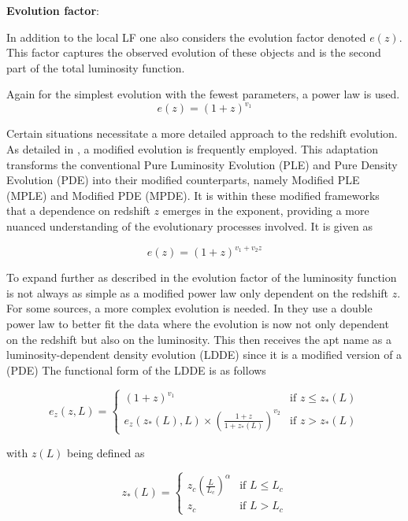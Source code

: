 \documentclass{article}
\begin{document}


\textbf{Evolution factor}:

In addition to the local LF one also considers the evolution factor denoted $e(z)$. This factor captures the observed evolution of these objects and is the second part of the total luminosity function.

Again for the simplest evolution with the fewest parameters, a power law is used.
 $$
e(z) = (1 + z)^{v_1 }
 $$


  
Certain situations necessitate a more detailed approach to the redshift evolution. 
 As detailed in \cite{Ajello_2009}, a modified evolution is frequently employed. 
 This adaptation transforms the conventional Pure Luminosity Evolution (PLE) and Pure Density Evolution 
 (PDE) into their modified counterparts, namely Modified PLE (MPLE) and Modified PDE (MPDE).
It is within these modified frameworks that a dependence on redshift $z$ emerges in the exponent,
providing a more nuanced understanding of the evolutionary processes involved. It is given as

$$
e(z) = (1 + z)^{v_1 +v_2 z }
 $$



 To expand further as described in \cite{Silverman_2008} the evolution factor of the luminosity function is not always as simple as a modified power law only dependent on the redshift $z$.
For some sources, a more complex evolution is needed. In \cite{Silverman_2008} they use a double power law to better fit the data where 
 the evolution is now not only dependent on the redshift but also on the luminosity. This then receives the apt name as a luminosity-dependent density evolution (LDDE) since it is a modified version of a (PDE)
 The functional form of the LDDE is as follows


 \begin{equation}
    e_z(z, L) = 
    \begin{cases} 
    (1 + z)^{v_1} & \text{if } z \leq z_*(L) \\
    e_z(z_*(L), L) \times \left( \frac{1 + z}{1 + z_*(L)} \right)^{v_2} & \text{if } z >  z_*(L)
    \end{cases}
 \end{equation}

 with $z(L)$ being defined as

 \begin{equation}
    z_*(L) = 
    \begin{cases} 
    z_c \left( \frac{L}{L_c} \right)^\alpha & \text{if } L \leq L_c \\
    z_c & \text{if } L > L_c 
    \end{cases}
 \end{equation}
\end{document}
